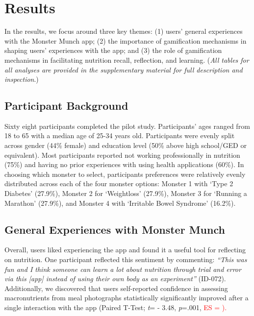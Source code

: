 \vspace{-5pt}
\section{Results}

In the results, we focus around three key themes: (1) users' general experiences with the Monster Munch app; (2) the importance of gamification mechanisms in shaping users' experiences with the app; and (3) the role of gamification mechanisms in facilitating nutrition recall, reflection, and learning. (\textit{All tables for all analyses are provided in the supplementary material for full description and inspection}.)

\vspace{-5pt}
\subsection{Participant Background}
Sixty eight participants completed the pilot study. Participants' ages ranged from 18 to 65 with a median age of 25-34 years old. Participants were evenly split across gender (44\% female) and education level (50\% above high school/GED or equivalent). Most participants reported not working professionally in nutrition (75\%) and having no prior experiences with using health applications (60\%). In choosing which monster to select, participants preferences were relatively evenly distributed across each of the four monster options: Monster 1 with `Type 2 Diabetes' (27.9\%), Monster 2 for `Weightloss' (27.9\%), Monster 3 for `Running a Marathon' (27.9\%), and Monster 4 with `Irritable Bowel Syndrome' (16.2\%). 
\vspace{-5pt}
\subsection{General Experiences with Monster Munch}

Overall, users liked experiencing the app and found it a useful tool for reflecting on nutrition. One participant reflected this sentiment by commenting: \textit{``This was fun and I think someone can learn a lot about nutrition through trial and error via this [app] instead of using their own body as an experiment''} (ID-072). Additionally, we discovered that users self-reported confidence in assessing macronutrients from meal photographs statistically significantly improved after a single interaction with the app (Paired T-Test; \textit{t}= - 3.48, \textit{p}=.001, \textcolor{red}{ES = ).} %

